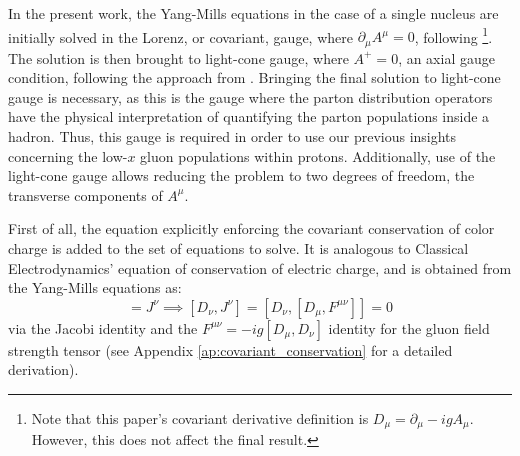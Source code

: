 In the present work, the Yang-Mills equations in the case of a single nucleus are initially solved in the Lorenz, or covariant, gauge, where $\partial_\mu A^\mu=0$, following %
\cite{Blaizot_2004}\footnote{Note that this paper's covariant derivative definition is $D_\mu=\partial_\mu -igA_\mu$. However, this does not affect the final result.}. The solution is then brought to light-cone gauge, where $A^+=0$, an axial gauge condition, following the approach from 
\citep{Carrington_2022}. 
Bringing the final solution to light-cone gauge is necessary, as this is the gauge where the parton distribution operators have the physical interpretation of quantifying the parton populations inside a hadron.
\citep{Kovner_1995,Lappi_high_energy,Iancu:2000hn} Thus, this gauge is required in order to use our previous insights concerning the low-$x$ gluon populations within protons. Additionally, use of the light-cone gauge allows reducing the problem to two degrees of freedom, the transverse components of $A^\mu$. 
\citep{Lappi_high_energy}

First of all, the equation explicitly enforcing the covariant conservation of color charge is added to the set of equations to solve. It is analogous to Classical Electrodynamics' equation of conservation of electric charge, and is obtained from the Yang-Mills equations as:
\begin{equation}
	[D_\mu, F^{\mu \nu}] = J^\nu \implies [D_\nu, J^\nu] = [D_\nu, [D_\mu, F^{\mu \nu}]] = 0
	\label{eq:covariant_conservation}
\end{equation}
via the Jacobi identity and the $F^{\mu \nu} = -ig [D_\mu, D_\nu]$ identity for the gluon field strength tensor (see Appendix \ref{ap:covariant_conservation} for a detailed derivation). %

